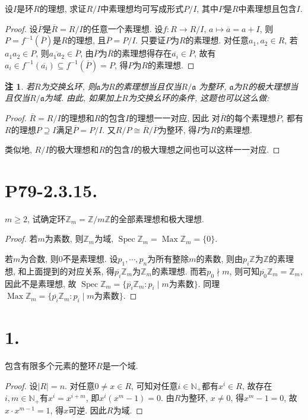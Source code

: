 \documentclass[12pt, a4paper, fontset=windows]{ctexart}
\newcommand{\N}{\mathbb{N}}
\newcommand{\Z}{\mathbb{Z}}
\newcommand{\Max}{\operatorname{Max}}
\newcommand{\Spec}{\operatorname{Spec}}
\newcommand{\abs}[1]{\left|{#1}\right|}
\newcommand{\cl}[1]{\overline{#1}} %
\newcommand{\isom}{\cong} %
\newtheorem*{remark}{注}
\begin{document}
设$I$是环$R$的理想, 求证$R/I$中素理想均可写成形式$P/I$, 
其中$P$是$R$中素理想且包含$I$. 

\begin{proof}
设$\cl{P}$是$\cl{R}=R/I$的任意一个素理想. 设$f:R\to R/I$, $a\mapsto\cl{a}=a+I$, 
则$P=f^{-1}(\cl{P})$是$R$的理想, 且$\cl{P}=P/I$. 只要证$P$为$R$的素理想. 
对任意$a_1,a_2\in R$, 若$a_1a_2\in P$, 则$\cl{a_1a_2}\in\cl{P}$, 
由$\cl{P}$为$\cl{R}$的素理想得存在$\cl{a_i}\in\cl{P}$, 
故有$a_i\in f^{-1}(\cl{a_i})\subseteq f^{-1}(\cl{P})=P$, 
得$P$为$R$的素理想. 
\end{proof}

\begin{remark}{
\def\a{\mathfrak{a}}
若$R$为交换幺环, 则$\a$为$R$的素理想当且仅当$R/\a$
为整环, $\a$为$R$的极大理想当且仅当$R/\a$为域. 
由此, 如果加上$R$为交换幺环的条件, 这题也可以这么做: 
}\end{remark}

\begin{proof}
$\cl{R}=R/I$的理想和$R$的包含$I$的理想一一对应, 因此
对$\cl{R}$的每个素理想$\cl{P}$, 都有$R$的理想$P\supseteq I$满足$\cl{P}=P/I$. 
又$R/P\isom\cl{R}/\cl{P}$为整环, 得$P$为$R$的素理想. 

类似地, $R/I$的极大理想和$R$的包含$I$的极大理想之间也可以这样一一对应. 
\end{proof}

\section*{P79-2.3.15.}

$m\ge 2$, 试确定环$\Z_m=\Z/m\Z$的全部素理想和极大理想. 

\begin{proof}
若$m$为素数, 则$\Z_m$为域, $\Spec\Z_m=\Max\Z_m=\{0\}$. 

若$m$为合数, 则$0$不是素理想. 设$p_1,\cdots,p_n$为所有整除$m$的素数, 
则由$p_i\Z$为$\Z$的素理想, 和上面提到的对应关系, 
得$\cl{p_i}\Z_m$为$\Z_m$的素理想. 而若$p_0\nmid m$, 
则可知$\cl{p_0}\Z_m=\Z_m$, 因此不是素理想, 故
$\Spec\Z_m=\{\cl{p_i}\Z_m:p_i\mid m$为素数$\}$. 
同理$\Max\Z_m=\{\cl{p_i}\Z_m:p_i\mid m$为素数$\}$. 
\end{proof}

\section*{1.}

包含有限多个元素的整环$R$是一个域. 

\begin{proof}
设$\abs{R}=n$. 对任意$0\ne x\in R$, 可知对任意$i\in\N_+$都有$x^i\in R$, 
故存在$i,m\in\N_+$有$x^i=x^{i+m}$, 即$x^i(x^m-1)=0$. 
由$R$为整环, $x\ne 0$, 得$x^m-1=0$, 故$x\cdot x^{m-1}=1$, 
得$x$可逆. 因此$R$为域. 
\end{proof}
\end{document}
